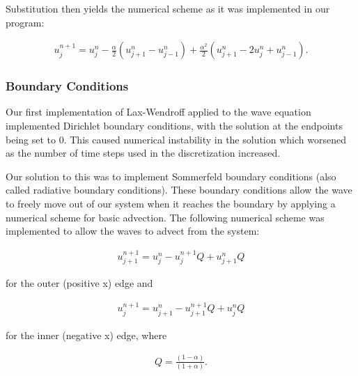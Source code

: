 \documentclass[../main.tex]{subfiles}
\begin{document}
\noindent Substitution then yields the numerical scheme as it was implemented in our program:

\begin{gather}
	u^{n+1}_{j} = u^n_j - \frac{\alpha}{2}(u^{n}_{j+1}-u^n_{j-1}) + \frac{\alpha^2}{2}(u^{n}_{j+1}-2u^n_j+u^n_{j-1}).
\end{gather}

\subsubsection{Boundary Conditions}

Our first implementation of Lax-Wendroff applied to the wave equation implemented Dirichlet boundary conditions, with the solution at the endpoints being set to $0$. This caused numerical instability in the solution which worsened as the number of time steps used in the discretization increased.

Our solution to this was to implement Sommerfeld boundary conditions (also called radiative boundary conditions). These boundary conditions allow the wave to freely move out of our system when it reaches the boundary by applying a numerical scheme for basic advection. The following numerical scheme was implemented to allow the waves to advect from the system:

\begin{gather}
	u^{n+1}_{j+1} = u^n_j - u^{n+1}_jQ+u^n_{j+1}Q	
\end{gather}

\noindent for the outer (positive x) edge and 

\begin{gather}
	u^{n+1}_j = u^n_{j+1}-u^{n+1}_{j+1}Q+u^n_jQ
\end{gather}

\noindent for the inner (negative x) edge, where 

\begin{gather}
	Q = \frac{(1-\alpha)}{(1+\alpha)}.
\end{gather}
\end{document}
